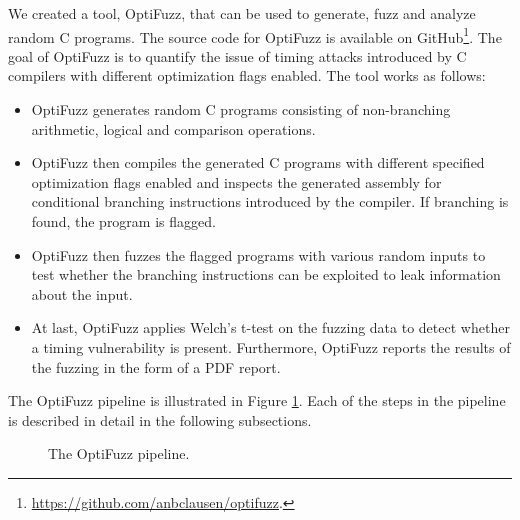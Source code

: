 \label{sec:optifuzz}
We created a tool, OptiFuzz, that can be used to generate, fuzz and analyze random C programs.
The source code for OptiFuzz is available on GitHub\footnote{\url{https://github.com/anbclausen/optifuzz}.}.
The goal of OptiFuzz is to quantify the issue of timing attacks introduced by C compilers with different optimization flags enabled.
The tool works as follows:
\begin{itemize}
  \setlength\itemsep{-0.6em}
  \item OptiFuzz generates random C programs consisting of non-branching arithmetic, logical and comparison operations.
  \item OptiFuzz then compiles the generated C programs with different specified optimization flags enabled and inspects the generated assembly for conditional branching instructions introduced by the compiler.
        If branching is found, the program is flagged.
  \item OptiFuzz then fuzzes the flagged programs with various random inputs to test whether the branching instructions can be exploited to leak information about the input.
  \item At last, OptiFuzz applies Welch's t-test on the fuzzing data to detect whether a timing vulnerability is present.
        Furthermore, OptiFuzz reports the results of the fuzzing in the form of a PDF report.
\end{itemize}
The OptiFuzz pipeline is illustrated in Figure \ref{fig:optifuzz-pipeline}. 
Each of the steps in the pipeline is described in detail in the following subsections.
\begin{figure}[H]
  \centering
  
  \caption{The OptiFuzz pipeline.}
  \label{fig:optifuzz-pipeline}
\end{figure}
